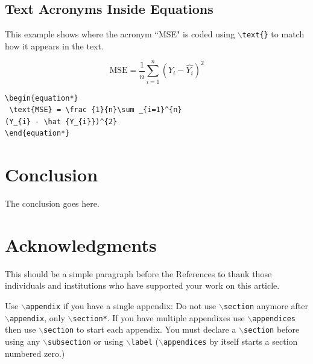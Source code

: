 \documentclass[]{IEEEtran}
\begin{document}
\subsection{ Text Acronyms Inside Equations}
This example shows where the acronym ``MSE" is coded using $\backslash${\tt{text\{\}}} to match how it appears in the text.

\begin{equation*}
	\text{MSE} = \frac {1}{n}\sum _{i=1}^{n}(Y_{i} - \hat {Y_{i}})^{2}
\end{equation*}

\begin{verbatim}
\begin{equation*}
 \text{MSE} = \frac {1}{n}\sum _{i=1}^{n}
(Y_{i} - \hat {Y_{i}})^{2}
\end{equation*}
\end{verbatim}

\section{Conclusion}
The conclusion goes here.


\section*{Acknowledgments}
This should be a simple paragraph before the References to thank those individuals and institutions who have supported your work on this article.



	{
		Use $\backslash${\tt{appendix}} if you have a single appendix:
		Do not use $\backslash${\tt{section}} anymore after $\backslash${\tt{appendix}}, only $\backslash${\tt{section*}}.
		If you have multiple appendixes use $\backslash${\tt{appendices}} then use $\backslash${\tt{section}} to start each appendix.
		You must declare a $\backslash${\tt{section}} before using any $\backslash${\tt{subsection}} or using $\backslash${\tt{label}} ($\backslash${\tt{appendices}} by itself
		starts a section numbered zero.)}



\end{document}
